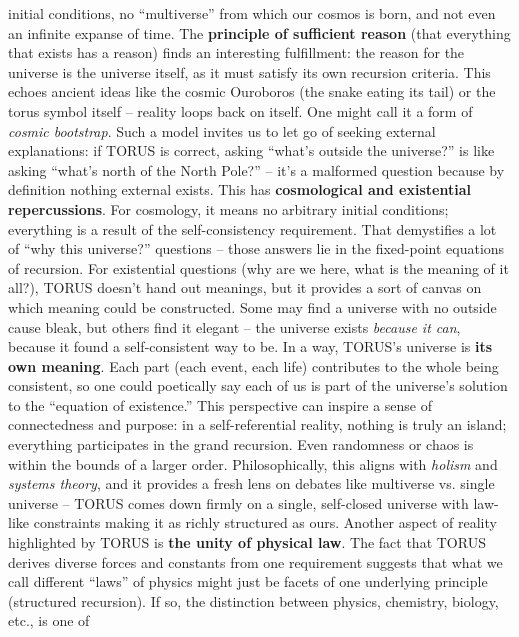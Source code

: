 \documentclass[]{article}
\begin{document}
\begin{itemize}
  initial conditions, no ``multiverse'' from which our cosmos is born,
  and not even an infinite expanse of time. The \textbf{principle of
  sufficient reason} (that everything that exists has a reason) finds an
  interesting fulfillment: the reason for the universe is the universe
  itself, as it must satisfy its own recursion criteria. This echoes
  ancient ideas like the cosmic Ouroboros (the snake eating its tail) or
  the torus symbol itself -- reality loops back on itself. One might
  call it a form of \emph{cosmic bootstrap}. Such a model invites us to
  let go of seeking external explanations: if TORUS is correct, asking
  ``what's outside the universe?'' is like asking ``what's north of the
  North Pole?'' -- it's a malformed question because by definition
  nothing external exists. This has \textbf{cosmological and existential
  repercussions}. For cosmology, it means no arbitrary initial
  conditions; everything is a result of the self-consistency
  requirement. That demystifies a lot of ``why this universe?''
  questions -- those answers lie in the fixed-point equations of
  recursion. For existential questions (why are we here, what is the
  meaning of it all?), TORUS doesn't hand out meanings, but it provides
  a sort of canvas on which meaning could be constructed. Some may find
  a universe with no outside cause bleak, but others find it elegant --
  the universe exists \emph{because it can}, because it found a
  self-consistent way to be. In a way, TORUS's universe is \textbf{its
  own meaning}. Each part (each event, each life) contributes to the
  whole being consistent, so one could poetically say each of us is part
  of the universe's solution to the ``equation of existence.'' This
  perspective can inspire a sense of connectedness and purpose: in a
  self-referential reality, nothing is truly an island; everything
  participates in the grand recursion. Even randomness or chaos is
  within the bounds of a larger order. Philosophically, this aligns with
  \emph{holism} and \emph{systems theory}, and it provides a fresh lens
  on debates like multiverse vs. single universe -- TORUS comes down
  firmly on a single, self-closed universe with law-like constraints
  making it as richly structured as ours. Another aspect of reality
  highlighted by TORUS is \textbf{the unity of physical law}. The fact
  that TORUS derives diverse forces and constants from one requirement
  suggests that what we call different ``laws'' of physics might just be
  facets of one underlying principle (structured recursion). If so, the
  distinction between physics, chemistry, biology, etc., is one of

\end{itemize}
\end{document}

